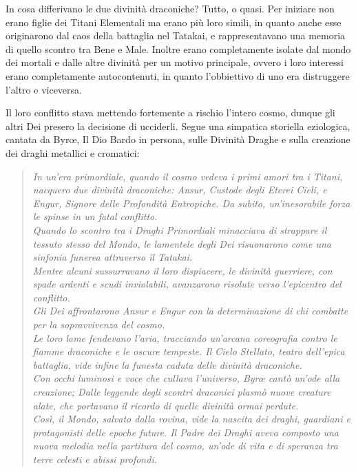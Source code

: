 \documentclass[10pt, a4paper]{report}
\begin{document}
\begin{multicols}{2}
In cosa differivano le due divinità draconiche? Tutto, o quasi. Per iniziare non erano figlie dei Titani Elementali ma erano più loro simili, in quanto anche esse originarono dal caos della battaglia nel Tatakai, e rappresentavano una memoria di quello scontro tra Bene e Male. Inoltre erano completamente isolate dal mondo dei mortali e dalle altre divinità per un motivo principale, ovvero i loro interessi erano completamente autocontenuti, in quanto l'obbiettivo di uno era distruggere l'altro e viceversa. 
\newcolumn

Il loro conflitto stava mettendo fortemente a rischio l'intero cosmo, dunque gli altri Dei presero la decisione di ucciderli.
Segue una simpatica storiella eziologica, cantata da Byrœ, Il Dio Bardo in persona, sulle Divinità Draghe e sulla creazione dei draghi metallici e cromatici:

\begin{verse}
	\textit{In un'era primordiale, quando il cosmo vedeva i primi amori tra i Titani, nacquero due divinità draconiche: Ansur, Custode degli Eterei Cieli, e Engur, Signore delle Profondità Entropiche. Da subito, un'inesorabile forza le spinse in un fatal conflitto.\\
	Quando lo scontro tra i Draghi Primordiali minacciava di strappare il tessuto stesso del Mondo, le lamentele degli Dei risuonarono come una sinfonia funerea attraverso il Tatakai. \\
	Mentre alcuni sussurravano il loro dispiacere, le divinità guerriere, con spade ardenti e scudi inviolabili, avanzarono risolute verso l'epicentro del conflitto.\\
	Gli Dei affrontarono Ansur e Engur con la determinazione di chi combatte per la sopravvivenza del cosmo. \\Le loro lame fendevano l'aria, tracciando un'arcana coreografia contro le fiamme draconiche e le oscure tempeste.
	Il Cielo Stellato, teatro dell'epica battaglia, vide infine la funesta caduta delle divinità draconiche.\\
	Con occhi luminosi e voce che cullava l'universo, Byrœ cantò un'ode alla creazione; Dalle leggende degli scontri draconici plasmò nuove creature alate, che portavano il ricordo di quelle divinità ormai perdute.\\
	Così, il Mondo, salvato dalla rovina, vide la nascita dei draghi, guardiani e protagonisti delle epoche future. Il Padre dei Draghi aveva composto una nuova melodia nella partitura del cosmo, un'ode di vita e di speranza tra terre celesti e abissi profondi.}
\end{verse}


\end{multicols}
\end{document}
